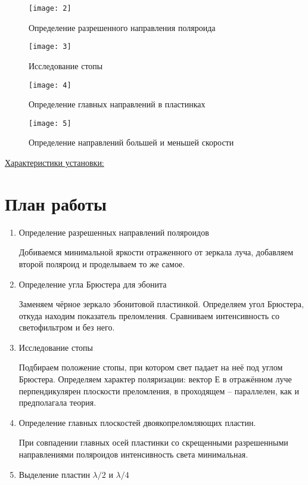 \documentclass{letask}
\begin{document}
\begin{figure}[H]
\centering
\begin{minipage}[h]{0.24\linewidth}
\texttt{[image: 2]}
\label{1}
\caption{Определение разрешенного направления поляроида} 
\end{minipage}
\hfill 
\begin{minipage}[h]{0.24\linewidth}
\texttt{[image: 3]}
\label{2}
\caption{Исследование стопы}
\end{minipage}
\hfill 
\begin{minipage}[h]{0.24\linewidth}
\texttt{[image: 4]}
\label{3}
\caption{Определение главных направлений в пластинках}
\end{minipage}
\hfill 
\begin{minipage}[h]{0.24\linewidth}
\texttt{[image: 5]}
\label{4}
\caption{Определение направлений большей и меньшей скорости}
\end{minipage}
\end{figure}

\underline{Характеристики установки:}


\section{План работы}

\begin{enumerate}
\item Определение разрешенных направлений поляроидов

Добиваемся минимальной яркости отраженного от зеркала луча, добавляем второй поляроид и проделываем то же самое.

\item Определение угла Брюстера для эбонита

Заменяем чёрное зеркало эбонитовой пластинкой. Определяем угол Брюстера, откуда находим показатель преломления. Сравниваем интенсивность со светофильтром и без него.

\item Исследование стопы

Подбираем положение стопы, при котором свет падает на неё под углом Брюстера. Определяем характер поляризации: вектор Е в отражённом луче перпендикулярен плоскости преломления, в проходящем – параллелен, как и предполагала теория.

\item Определение главных плоскостей двоякопреломляющих пластин.

При совпадении главных осей пластинки со скрещенными разрешенными направлениями поляроидов интенсивность света минимальная.

\item Выделение пластин $\lambda/2$ и $\lambda/4$ 



\end{enumerate}
\end{document}
